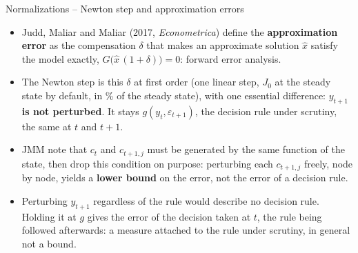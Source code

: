\documentclass[11pt,aspectratio=169]{beamer}
\begin{document}
\begin{frame}{Normalizations -- Newton step and approximation errors}

\begin{itemize}

\item Judd, Maliar and Maliar (2017, \textit{Econometrica}) define the \textbf{approximation error} as the compensation $\delta$ that makes an approximate solution $\hat x$ satisfy the model exactly, $G\big(\hat x\,(1+\delta)\big)=0$: forward error analysis.\newline

\item The Newton step is this $\delta$ at first order (one linear step, $J_0$ at the steady state by default, in \% of the steady state), with one essential difference: \textbf{$y_{t+1}$ is not perturbed}. It stays $g(y_t, \varepsilon_{t+1})$, the decision rule under scrutiny, the same at $t$ and $t+1$.\newline

\item JMM note that $c_t$ and $c_{t+1,j}$ must be generated by the same function of the state, then drop this condition on purpose: perturbing each $c_{t+1,j}$ freely, node by node, yields a \textbf{lower bound} on the error, not the error of a decision rule.\newline

\item Perturbing $y_{t+1}$ regardless of the rule would describe no decision rule. Holding it at $g$ gives the error of the decision taken at $t$, the rule being followed afterwards: a measure attached to the rule under scrutiny, in general not a bound.

\end{itemize}

\end{frame}
\end{document}
